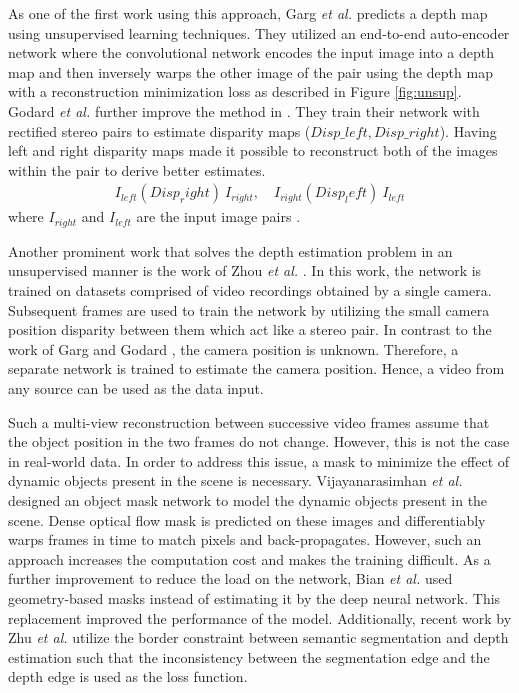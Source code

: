  As one of the first work using this approach, Garg \textit{et al.} \cite{10.1007/978-3-319-46484-8_45} predicts a depth map using unsupervised learning techniques. They utilized an end-to-end auto-encoder network where the convolutional network encodes the input image into a depth map and then inversely warps the other image of the pair using the depth map with a reconstruction minimization loss as described in Figure \ref{fig:unsup}.
 Godard \textit{et al.} \cite{godard2017unsupervised} further improve the method in \cite{10.1007/978-3-319-46484-8_45}. They train their network with rectified stereo pairs to estimate disparity maps ($ Disp\_left , Disp\_right $). Having left and right
 disparity maps made it possible to reconstruct both of the images within the pair to derive better estimates.
 \begin{align*}
 	I_{left}(Disp_right)~ I_{right}, \quad I_{right}(Disp_left)~ I_{left}
 \end{align*}
 where $ I_{right} $ and $ I_{left} $ are the input image pairs \cite{mertan2021single}.
 
Another prominent work that solves the depth estimation problem in an unsupervised manner is the work of Zhou \textit{et al.} \cite{Zhou_2017_CVPR}. In this work, the network is trained on datasets comprised of video recordings obtained by a single camera. Subsequent frames are used to train the network by utilizing the small camera position  disparity between them which act like a stereo pair. In contrast to the work of Garg \cite{10.1007/978-3-319-46484-8_45} and Godard \cite{godard2017unsupervised}, the camera position is unknown. Therefore, a separate network is trained to estimate the camera position. Hence, a video from any source can be used as the data input.

Such a multi-view  reconstruction between successive video frames assume that the object position in the two frames do not change. However, this is not the case in real-world data. In order to address this issue, a
mask to minimize the effect of dynamic objects present in the scene is necessary. Vijayanarasimhan \textit{et al.} \cite{vijayanarasimhan2017sfmnet}  designed an object mask network to model the dynamic objects present in the
scene. Dense optical flow mask is predicted on these images and differentiably warps frames in time to match pixels and back-propagates. However, such an approach increases the computation cost and makes the training difficult. 
As a further improvement to reduce the load on the network, Bian \textit{et al.} \cite{bian2019unsupervised}  used geometry-based masks instead of estimating it by the deep neural network. This replacement improved the performance of the model.
Additionally, recent work by Zhu \textit{et al.}\cite{zhu2020edge} utilize the border constraint between semantic segmentation and depth estimation such that the inconsistency between the segmentation edge and the depth edge is used as the loss function.
